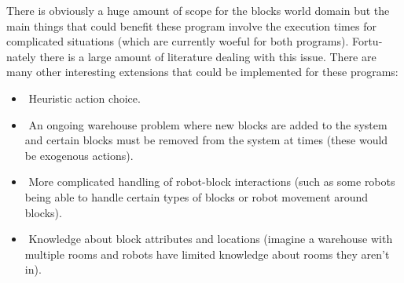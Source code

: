 \documentclass{article}
\begin{document}
There is obviously a huge amount of scope for the blocks world domain but the
main things that could benefit these program involve the execution times for
complicated situations (which are currently woeful for both programs). Fortu-
nately there is a large amount of literature dealing with this issue.
There are many other interesting extensions that could be implemented for
these programs:
\begin{itemize}
	\item Heuristic action choice.
	\item An ongoing warehouse problem where new blocks are added to the system
and certain blocks must be removed from the system at times (these would
be exogenous actions).
	\item More complicated handling of robot-block interactions (such as some robots
being able to handle certain types of blocks or robot movement around
blocks).
	\item Knowledge about block attributes and locations (imagine a warehouse
with multiple rooms and robots have limited knowledge about rooms they
aren't in).
\end{itemize}
\end{document}
